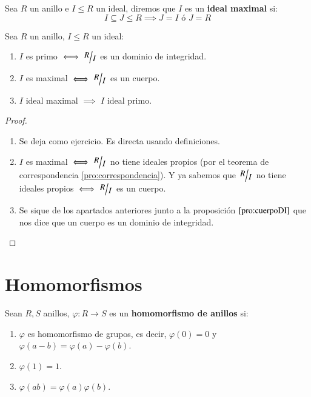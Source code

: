 \begin{dfn}
    Sea $R$ un anillo e $I \leq R$ un ideal, diremos que $I$ es un \textbf{ideal maximal} si:
    $$
        I \subseteq J \leq R \implies J = I \text { ó } J = R
    $$
\end{dfn}
\begin{thm}\label{thm:cocienteideales}
    Sea $R$ un anillo, $I \leq R$ un ideal:\\
    \begin{enumerate}
        \item $I$ es primo $\iff \quo{R}{I}$ es un dominio de integridad.
        \item $I$ es maximal $\iff \quo{R}{I}$ es un cuerpo.
        \item $I$ ideal maximal $\implies$ $I$ ideal primo.
    \end{enumerate}
\end{thm}
\begin{proof}$ $
    \begin{enumerate}
        \item Se deja como ejercicio. Es directa usando definiciones.
        \item $I$ es maximal $\iff \quo{R}{I}$ no tiene ideales propios (por el teorema de correspondencia \ref{pro:correspondencia}). Y ya sabemos que $\quo{R}{I}$ no tiene ideales propios $\iff \quo{R}{I}$ es un cuerpo.
        \item Se sique de los apartados anteriores junto a la proposición $\ref{pro:cuerpoDI}$ que nos dice que un cuerpo es un dominio de integridad.
    \end{enumerate}
\end{proof}

\section{Homomorfismos}

\begin{dfn}
    Sean $R, S$ anillos, $\varphi: R \to S$ es un \textbf{homomorfismo de anillos} si:\\
    \begin{enumerate}
        \item $\varphi$ es homomorfismo de grupos, es decir, $\varphi(0) = 0$ y $\varphi(a - b) = \varphi(a) - \varphi(b)$.
        \item $\varphi(1) = 1$.
        \item $\varphi(ab) = \varphi(a)\varphi(b)$.
    \end{enumerate}
\end{dfn}

